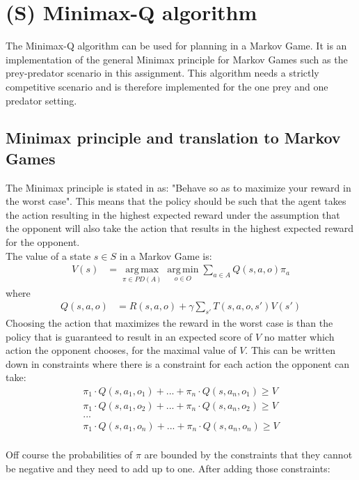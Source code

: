 
\section{(S) Minimax-Q algorithm}
The Minimax-Q algorithm can be used for planning in a Markov Game. It is an implementation of the general Minimax principle for Markov Games such as the prey-predator scenario in this assignment. This algorithm needs a strictly competitive scenario and is therefore implemented for the one prey and one predator setting. 

\subsection{Minimax principle and translation to Markov Games}
The Minimax principle is stated in \cite{minimax} as: "Behave so as to maximize your reward in the worst case". This means that the policy should be such that the agent takes the action resulting in the highest expected reward under the assumption that the opponent will also take the action that results in the highest expected reward for the opponent.  \\

 
The value of a state $s\in S$ in a Markov Game is:
\begin{align*}
V(s) &= \operatorname*{arg\,max}_{\pi \in PD(A)}
\operatorname*{arg\,min}_{o \in O}
\sum_{a \in A} Q(s,a,o) \pi_a
\end{align*}
where
\begin{align*}
Q(s,a,o) &= R(s,a,o) + \gamma \sum_{s'} T(s,a,o,s')V(s')
\end{align*}
Choosing the action that maximizes the reward in the worst case is than the policy that is guaranteed to result in an expected score of $V$ no matter which action the opponent chooses, for the maximal value of $V$. This can be written down in constraints where there is a constraint for each action the opponent can take:
%  
\begin{align*}
\pi_1 \cdot Q(s,a_1,o_1)+ ... + \pi_n \cdot Q(s,a_n,o_1) \geq V\\
\pi_1 \cdot Q(s,a_1,o_2)+ ... + \pi_n \cdot Q(s,a_n,o_2) \geq V\\
...\\
\pi_1 \cdot Q(s,a_1,o_n)+ ... + \pi_n \cdot Q(s,a_n,o_n) \geq V\\
\end{align*}

Off course the probabilities of $\pi$ are bounded by the constraints that they cannot be negative and they need to add up to one. After adding those constraints:

